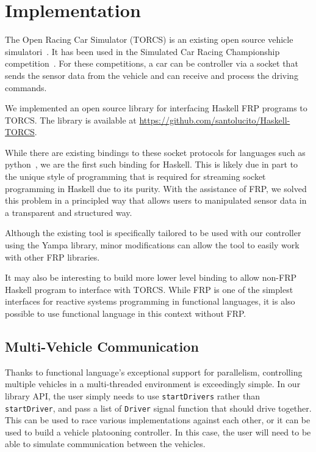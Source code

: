 \section{Implementation}

The Open Racing Car Simulator (TORCS) is an existing open source vehicle simulatori~\cite{torcs}.
It has been used in the Simulated Car Racing Championship competition~\cite{SCRC}.
For these competitions, a car can be controller via a socket that sends the sensor data from the vehicle and can receive and process the driving commands.

We implemented an open source library for interfacing Haskell FRP programs to TORCS.
The library is available at \url{https://github.com/santolucito/Haskell-TORCS}.

While there are existing bindings to these socket protocols for languages such as python~\cite{snakeoil,pyscrc}, we are the first such binding for Haskell.
This is likely due in part to the unique style of programming that is required for streaming socket programming in Haskell due to its purity.
With the assistance of FRP, we solved this problem in a principled way that allows users to manipulated sensor data in a transparent and structured way.


Although the existing tool is specifically tailored to be used with our controller using the Yampa library,
  minor modifications can allow the tool to easily work with other FRP libraries.

It may also be interesting to build more lower level binding to allow non-FRP Haskell program to interface with TORCS.
While FRP is one of the simplest interfaces for reactive systems programming in functional languages, it is also possible to use functional language in this context without FRP.

\subsection{Multi-Vehicle Communication}

Thanks to functional language's exceptional support for parallelism, controlling multiple vehicles in a multi-threaded environment is exceedingly simple. 
In our library API, the user simply needs to use \texttt{startDrivers} rather than \texttt{startDriver}, and pass a list of \texttt{Driver} signal function that should drive together.
This can be used to race various implementations against each other, or it can be used to build a vehicle platooning controller.
In this case, the user will need to be able to simulate communication between the vehicles.

